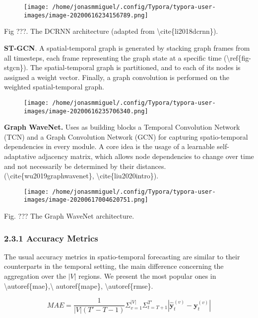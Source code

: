 \documentclass[
]{article}
\begin{document}
\begin{figure}
\centering
\texttt{[image: /home/jonasmmiguel/.config/Typora/typora-user-images/image-20200616234156789.png]}
\caption{}
\end{figure}

Fig ???. The DCRNN architecture (adapted from
\textbackslash cite\{li2018dcrnn\}).

\textbf{ST-GCN}. A spatial-temporal graph is generated by stacking graph
frames from all timesteps, each frame representing the graph state at a
specific time (\textbackslash ref\{fig-stgcn\}). The spatial-temporal
graph is partitioned, and to each of its nodes is assigned a weight
vector. Finally, a graph convolution is performed on the weighted
spatial-temporal graph.

\begin{figure}
\centering
\texttt{[image: /home/jonasmmiguel/.config/Typora/typora-user-images/image-20200616235706340.png]}
\caption{}
\end{figure}

\textbf{Graph WaveNet.} Uses as building blocks a Temporal Convolution
Network (TCN) and a Graph Convolution Network (GCN) for capturing
spatio-temporal dependencies in every module. A core idea is the usage
of a learnable self-adaptative adjacency matrix, which allows node
dependencies to change over time and not necessarily be determined by
their distances. (\textbackslash cite\{wu2019graphwavenet\},
\textbackslash cite\{liu2020intro\}).

\begin{figure}
\centering
\texttt{[image: /home/jonasmmiguel/.config/Typora/typora-user-images/image-20200617004620751.png]}
\caption{}
\end{figure}

Fig. ??? The Graph WaveNet architecture.

\hypertarget{header-n172}{%
\subsubsection{2.3.1 Accuracy Metrics}\label{header-n172}}

The usual accuracy metrics in spatio-temporal forecasting are similar to
their counterparts in the temporal setting, the main difference
concerning the aggregation over the \(|V|\) regions. We present the most
popular ones in \textbackslash autoref\{mae\},\textbackslash{}
autoref\{mape\}, \textbackslash autoref\{rmse\}.

\begin{equation}\label{mae}
    MAE = \frac{1}{|V|(T'-T-1)} \Sigma_{v=1}^{|V|} \Sigma_{t=T+1}^{T'} | \bm{\hat{y}}^{(v)}_{t} - \bm{y}_{t}^{(v)} |
\end{equation}
\end{document}
